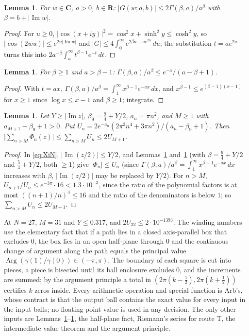 \documentclass[11pt]{article}
\theoremstyle{plain}
\newtheorem{lemma}[theorem]{Lemma}
\theoremstyle{definition}
\theoremstyle{remark}
\newcommand{\R}{\mathbf{R}}
\newcommand{\Cx}{\mathbf{C}}
\newcommand{\im}{\operatorname{Im}}
\begin{document}
\begin{lemma}\label{lem:B}
For $w \in \Cx$, $a > 0$, $b \in \R$:
$|G(w;a,b)| \le 2\Gamma(\beta, a)/a^\beta$ with $\beta = b + |\im w|$.
\end{lemma}

\begin{proof}
For $u \ge 0$, $|\cos(x+iy)|^2 = \cos^2 x + \sinh^2 y \le \cosh^2 y$, so
$|\cos(2wu)| \le e^{2u|\im w|}$ and
$|G| \le 4\int_0^\infty e^{2\beta u - ae^{2u}}\,du$; the substitution
$t = ae^{2u}$ turns this into $2a^{-\beta}\int_a^\infty t^{\beta-1}e^{-t}\,dt$.
\end{proof}

\begin{lemma}\label{lem:Gam}
For $\beta \ge 1$ and $a > \beta - 1$:
$\Gamma(\beta, a)/a^\beta \le e^{-a}/(a - \beta + 1)$.
\end{lemma}

\begin{proof}
With $t = ax$, $\Gamma(\beta,a)/a^\beta = \int_1^\infty x^{\beta-1}e^{-ax}\,dx$,
and $x^{\beta-1} \le e^{(\beta-1)(x-1)}$ for $x \ge 1$ since
$\log x \le x - 1$ and $\beta \ge 1$; integrate.
\end{proof}

\begin{lemma}\label{lem:T}
Let $Y \ge |\im z|$, $\beta_9 = \tfrac94 + Y/2$, $a_n = \pi n^2$, and $M \ge 1$
with $a_{M+1} - \beta_9 + 1 > 0$. Put
$U_n = 2e^{-a_n}(2\pi^2 n^4 + 3\pi n^2)/(a_n - \beta_9 + 1)$. Then
$\bigl|\sum_{n > M}\Phi_n(z)\bigr| \le \sum_{n>M}U_n \le 2U_{M+1}$.
\end{lemma}

\begin{proof}
In \eqref{eq:XiN}, $|\im(z/2)| \le Y/2$, and Lemmas~\ref{lem:B}
and~\ref{lem:Gam} (with $\beta = \tfrac94 + Y/2$ and $\tfrac54 + Y/2$, both
$\ge 1$) give $|\Phi_n| \le U_n$
(since $\Gamma(\beta,a)/a^\beta = \int_1^\infty x^{\beta-1}e^{-ax}\,dx$ increases with
$\beta$, $|\im(z/2)|$ may be replaced by $Y/2$). For $n > M$,
$U_{n+1}/U_n \le e^{-3\pi}\cdot 16 < 1.3\cdot10^{-3}$, since the ratio of the
polynomial factors is at most $((n+1)/n)^4 \le 16$ and the ratio of the
denominators is below $1$; so $\sum_{n>M}U_n \le 2U_{M+1}$.
\end{proof}

At $N = 27$, $M = 31$ and $Y \le 0.317$, and $2U_{32} \le 2\cdot10^{-1393}$. The
winding numbers use the elementary fact that if a path lies in a closed
axis-parallel box that excludes $0$, the box lies in an open half-plane through
$0$ and the continuous change of argument along the path equals the principal
value $\operatorname{Arg}(\gamma(1)/\gamma(0)) \in (-\pi, \pi)$. The boundary of
each square is cut into pieces, a piece is bisected until its ball enclosure
excludes $0$, and the increments are summed; by the argument principle a total
in $(2\pi(k - \tfrac12), 2\pi(k + \tfrac12))$ certifies $k$ zeros inside. Every
arithmetic operation and special function is Arb's, whose contract is that the
output ball contains the exact value for every input in the input balls; no
floating-point value is used in any decision. The only other inputs are
Lemmas~\ref{lem:B}--\ref{lem:T}, the half-plane fact, Riemann's series for
route T, the intermediate value theorem and the argument principle.
\end{document}
